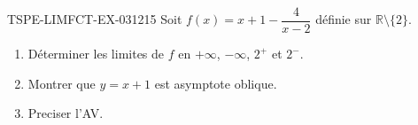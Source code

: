 \begin{exercice}{TSPE-LIMFCT-EX-031}{2}{15}
Soit $f(x) = x + 1 - \dfrac{4}{x-2}$ définie sur $\mathbb{R} \setminus \{2\}$.
\begin{enumerate}
  \item Déterminer les limites de $f$ en $+\infty$, $-\infty$, $2^+$ et $2^-$.
  \item Montrer que $y = x + 1$ est asymptote oblique.
  \item Preciser l'AV.
\end{enumerate}
\end{exercice}
